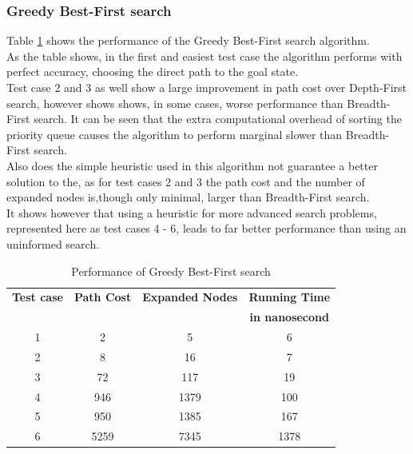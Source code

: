 \documentclass[journal]{IEEEtran}
\begin{document}
\subsubsection{Greedy Best-First search}
Table \ref{tab:gbfs} shows the performance of the Greedy Best-First search algorithm. \\
As the table shows, in the first and easiest test case the algorithm performs with perfect accuracy, choosing the direct path to the goal state. \\
Test case 2 and 3 as well show a large improvement in path cost over Depth-First search, however shows shows, in some cases, worse performance than Breadth-First search. It can be seen that the extra computational overhead of sorting the priority queue causes the algorithm to perform marginal slower than Breadth-First search.\\
Also does the simple heuristic used in this algorithm not guarantee a better solution to the, as for test cases 2 and 3 the path cost and the number of expanded nodes is,though only minimal, larger than Breadth-First search. \\
It shows however that using a heuristic for more advanced search problems, represented here as test cases 4 - 6, leads to far better performance than using an uninformed search. \\
\begin{table}[h]
\renewcommand{\arraystretch}{1.3}
\centering
\caption{Performance of Greedy Best-First search}
\begin{tabular}{|c|c|c|c|}
\hline
\bfseries Test case &\bfseries Path Cost & \bfseries Expanded Nodes & \bfseries Running Time \\
 & & &\bfseries in nanosecond\\\hline
1 & 2 & 5 & 6 \\
2 & 8 & 16 &7 \\
3 & 72 & 117 &19 \\
4 & 946 & 1379 & 100 \\
5 & 950 & 1385 & 167 \\
6 & 5259 & 7345 & 1378 \\\hline
\end{tabular}
\label{tab:gbfs}
\end{table}
\end{document}
